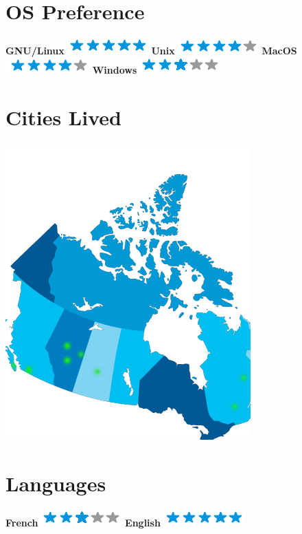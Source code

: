 \documentclass[]{vella-cv}
\begin{document}
\begin{aside}
~
~
~
  \section{OS Preference}
    \textbf{GNU/Linux}\includegraphics[scale=0.40]{img/5stars.png}
    \textbf{Unix}\includegraphics[scale=0.40]{img/4stars.png}
    \textbf{MacOS}\includegraphics[scale=0.40]{img/4stars.png}
    \textbf{Windows}\includegraphics[scale=0.40]{img/3stars.png}
    ~
  \section{Cities Lived}
    \includegraphics[scale=0.25]{img/canadaresidences.png}
    ~
  \section{Languages}
    \textbf{French}\includegraphics[scale=0.40]{img/3stars.png}
    \textbf{English}\includegraphics[scale=0.40]{img/5stars.png}
    ~
\end{aside}
\end{document}
